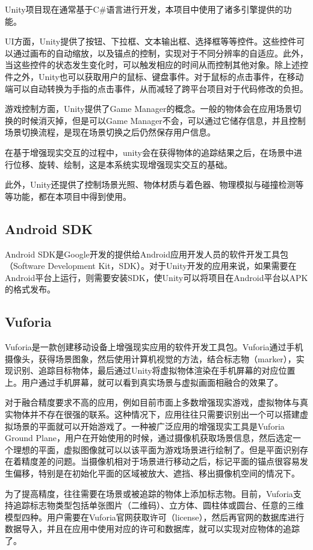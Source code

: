 Unity项目现在通常基于C\#语言进行开发，本项目中使用了诸多引擎提供的功能。
	
UI方面，Unity提供了按钮、下拉框、文本输出框、选择框等等控件。这些控件可以通过画布的自动缩放，以及锚点的控制，实现对于不同分辨率的自适应。此外，当这些控件的状态发生变化时，可以触发相应的时间从而控制其他对象。除上述控件之外，Unity也可以获取用户的鼠标、键盘事件。对于鼠标的点击事件，在移动端可以自动转换为手指的点击事件，从而减轻了跨平台项目对于代码修改的负担。

游戏控制方面，Unity提供了Game Manager的概念。一般的物体会在应用场景切换的时候消灭掉，但是可以Game Manager不会，可以通过它储存信息，并且控制场景切换流程，是现在场景切换之后仍然保存用户信息。

在基于增强现实交互的过程中，unity会在获得物体的追踪结果之后，在场景中进行位移、旋转、绘制，这是本系统实现增强现实交互的基础。

此外，Unity还提供了控制场景光照、物体材质与着色器、物理模拟与碰撞检测等等功能，都在本项目中得到使用。

\subsection{Android SDK}
Android SDK\cite{Android}是Google开发的提供给Android应用开发人员的软件开发工具包（Software Development Kit，SDK）。对于Unity开发的应用来说，如果需要在Android平台上运行，则需要安装SDK，使Unity可以将项目在Android平台以APK的格式发布。

\subsection{Vuforia}
Vuforia\cite{Vuforia}是一款创建移动设备上增强现实应用的软件开发工具包。Vuforia通过手机摄像头，获得场景图象，然后使用计算机视觉的方法，结合标志物（marker），实现识别、追踪目标物体，最后通过Unity将虚拟物体渲染在手机屏幕的对应位置上。用户通过手机屏幕，就可以看到真实场景与虚拟画面相融合的效果了。
	
对于融合精度要求不高的应用，例如目前市面上多数增强现实游戏，虚拟物体与真实物体并不存在很强的联系。这种情况下，应用往往只需要识别出一个可以搭建虚拟场景的平面就可以开始游戏了。一种被广泛应用的增强现实工具是Vuforia Ground Plane\cite{VuforiaGround}，用户在开始使用的时候，通过摄像机获取场景信息，然后选定一个理想的平面，虚拟图像就可以以该平面为游戏场景进行绘制了。但是平面识别存在着精度差的问题。当摄像机相对于场景进行移动之后，标记平面的锚点很容易发生偏移，特别是在初始化平面的区域被放大、遮挡、移出摄像机空间的情况下。

为了提高精度，往往需要在场景或被追踪的物体上添加标志物。目前，Vuforia支持追踪标志物类型包括单张图片（二维码）、立方体、圆柱体或圆台、任意的三维模型四种。用户需要在Vuforia官网获取许可（license），然后再官网的数据库进行数据导入，并且在应用中使用对应的许可和数据库，就可以实现对应物体的追踪了。
	
